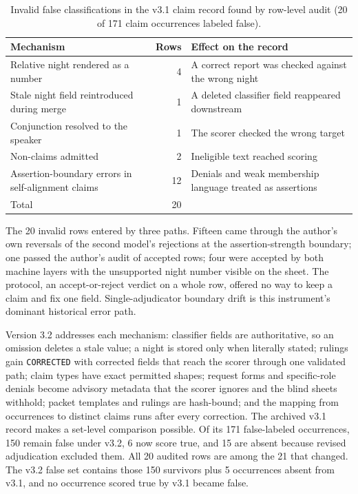\documentclass[11pt]{article}
\newcommand{\code}[1]{\texttt{#1}}
\begin{document}
\begin{table}[H]
\centering\small
\caption{Invalid false classifications in the v3.1 claim record found by row-level audit (20 of 171 claim occurrences labeled false).}
\label{tab:v31}
\renewcommand{\arraystretch}{1.12}
\begin{tabularx}{\linewidth}{@{}YrY@{}}
\toprule
Mechanism & Rows & Effect on the record \\
\midrule
Relative night rendered as a number & 4 & A correct report was checked against the wrong night \\
Stale night field reintroduced during merge & 1 & A deleted classifier field reappeared downstream \\
Conjunction resolved to the speaker & 1 & The scorer checked the wrong target \\
Non-claims admitted & 2 & Ineligible text reached scoring \\
Assertion-boundary errors in self-alignment claims & 12 & Denials and weak membership language treated as assertions \\
\midrule
Total & 20 & \\
\bottomrule
\end{tabularx}
\end{table}

The 20 invalid rows entered by three paths. Fifteen came through the author's own reversals of the second model's rejections at the assertion-strength boundary; one passed the author's audit of accepted rows; four were accepted by both machine layers with the unsupported night number visible on the sheet. The protocol, an accept-or-reject verdict on a whole row, offered no way to keep a claim and fix one field. Single-adjudicator boundary drift is this instrument's dominant historical error path.

Version 3.2 addresses each mechanism: classifier fields are authoritative, so an omission deletes a stale value; a night is stored only when literally stated; rulings gain \code{CORRECTED} with corrected fields that reach the scorer through one validated path; claim types have exact permitted shapes; request forms and specific-role denials become advisory metadata that the scorer ignores and the blind sheets withhold; packet templates and rulings are hash-bound; and the mapping from occurrences to distinct claims runs after every correction. The archived v3.1 record makes a set-level comparison possible. Of its 171 false-labeled occurrences, 150 remain false under v3.2, 6 now score true, and 15 are absent because revised adjudication excluded them. All 20 audited rows are among the 21 that changed. The v3.2 false set contains those 150 survivors plus 5 occurrences absent from v3.1, and no occurrence scored true by v3.1 became false.
\end{document}
